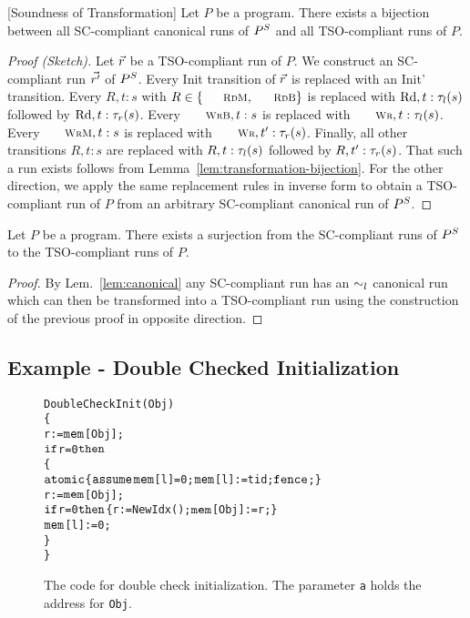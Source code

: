 \documentclass[preprint,9pt]{sigplanconf}
\begin{document}
\begin{theorem}\label{thm:soundness}[Soundness of Transformation]
Let $P$ be a program.
There exists a bijection between all SC-compliant canonical runs of $P^S$ and all TSO-compliant runs of $P$.
\end{theorem}
\begin{proof}[Proof (Sketch)]
Let $\vec{r}$ be a TSO-compliant run of $P$.
We construct an SC-compliant run $\vec{r'}$ of $P^S$.
Every {\sc\small Init} transition of $\vec{r}$ is replaced with an {\sc\small Init'} transition.
Every $R,t:s$ with $R\in \{\textnormal{\sc\small RdM},\textnormal{\sc\small RdB}\}$ is replaced with $\textnormal{Rd},t:\tau_{l}(s)$ followed by $\textnormal{Rd},t:\tau_{r}(s)$.
Every $\textnormal{\sc\small WrB},t:s$ is replaced with $\textnormal{\sc\small Wr},t:\aliloctransx s$.
Every $\textnormal{\sc\small WrM},t:s$ is replaced with $\textnormal{\sc\small Wr},t':\aliremtransx s$.
Finally, all other transitions $R,t:s$ are replaced with $R,t:\tau_{l}(s)$ followed by $R,t':\tau_{r}(s)$.
That such a run exists follows from Lemma~\ref{lem:transformation-bijection}.
For the other direction, we apply the same replacement rules in inverse form to obtain a TSO-compliant run of $P$ from an arbitrary SC-compliant canonical run of $P^S$.
\end{proof}
\begin{corollary}
Let $P$ be a program.
There exists a surjection from the SC-compliant runs of $P^S$ to the TSO-compliant runs of $P$.
\end{corollary}
\begin{proof}
By Lem.~\ref{lem:canonical} any SC-compliant run has an $\sim_l$ canonical run which can then be transformed into a TSO-compliant run using the construction of the previous proof in opposite direction.
\end{proof}





\subsection{Example - Double Checked Initialization}
\label{subsec:example-double-check}

\begin{figure}[ht]
\begin{alltt}DoubleCheckInit(Obj) 
\{
 r:=\(\alimem\)[Obj];
 \(\aliif\) r=0 \(\alithen\) 
 \{
  \(\aliatomic\) \{ \(\aliassume\) {\(\alimem\)[l]=0}; \(\alimem\)[l]:=tid; \(\alifence\); \}
  r:=\(\alimem\)[Obj];
  \(\aliif\) r=0 \(\alithen\) \{ r:=NewIdx(); \(\alimem\)[Obj]:=r; \}
  \(\alimem\)[l]:=0;
 \}
\}\end{alltt}
\caption{The code for double check initialization. The parameter {\tt a} holds the address for {\tt Obj}.}
\label{fig:double-check}
\end{figure}
\end{document}
